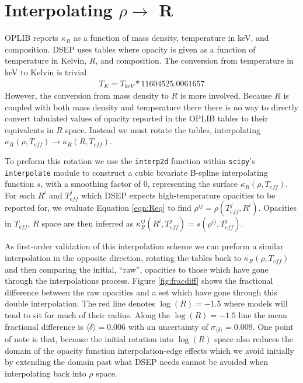 \section{Interpolating $\rho \rightarrow $ R}\label{apx:interp}
OPLIB reports $\kappa_{R}$ as a function of mass density, temperature in keV,
and composition. DSEP uses tables where opacity is given as a
function of temperature in Kelvin, $R$, and composition. The conversion from
temperature in keV to Kelvin is trivial
\begin{align}
	T_{K} = T_{keV} * 11604525.0061657
\end{align}
However, the conversion from mass density to $R$ is more involved. Because $R$ is
coupled with both mass density and temperature there there is no way to
directly convert tabulated values of opacity reported in the OPLIB tables to
their equivalents in $R$ space. Instead we must rotate the tables,
interpolating $\kappa_{R}(\rho,T_{eff}) \rightarrow \kappa_{R}(R,T_{eff})$. 

To preform this rotation we use the \texttt{interp2d} function within
\texttt{scipy}'s \texttt{interpolate} \citep{2020SciPy-NMeth} module to
construct a cubic bivariate B-spline \citep{Dierckx1981} interpolating function
$s$, with a smoothing factor of 0, representing the surface $\kappa_{R}(\rho,
T_{eff})$. For each $R^{i}$ and $T^{j}_{eff}$ which DSEP expects
high-temperature opacities to be reported for, we evaluate Equation
\ref{eqn:Req} to find $\rho^{ij} = \rho(T^{j}_{eff},R^{i})$.  Opacities in
$T_{eff}$, $R$ space are then inferred as $\kappa^{ij}_{R}(R^{i},T^{j}_{eff}) =
s(\rho^{ij}, T^{j}_{eff})$. 

As first-order validation of this interpolation scheme we can preform a similar
interpolation in the opposite direction, rotating the tables back to
$\kappa_{R}(\rho, T_{eff})$ and then comparing the initial, ``raw'', opacities
to those which have gone through the interpolations process. Figure
\ref{fig:fracdiff} shows the fractional difference between the raw opacities
and a set which have gone through this double interpolation. The red line
denotes $\log(R)=-1.5$ where models will tend to sit for much of their radius.
Along the $\log(R)=-1.5$ line the mean fractional difference is $\langle \delta
\rangle = 0.006$ with an uncertainty of $\sigma_{\langle\delta\rangle} =
0.009$. One point of note is that, because the initial rotation into $\log(R)$
space also reduces the domain of the opacity function interpolation-edge
effects which we avoid initially by extending the domain past what DSEP needs
cannot be avoided when interpolating back into $\rho$ space. 

